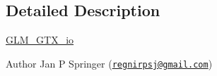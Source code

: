 \subsection{Detailed Description}
\hyperlink{group__gtx__io}{G\+L\+M\+\_\+\+G\+T\+X\+\_\+io}

\begin{DoxyAuthor}{Author}
Jan P Springer (\href{mailto:regnirpsj@gmail.com}{\tt regnirpsj@gmail.\+com}) 
\end{DoxyAuthor}
